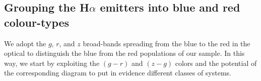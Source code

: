 \documentclass[fleqn,usenatbib]{mnras}
\newcommand{\comment}[1]{\textcolor{red}{#1}}
\begin{document}
\subsection{Grouping the H{$\alpha$} emitters into blue and red colour-types}
\label{sec:apply-hac-hdbscan}

We adopt the $g$, $r$, and $z$ broad-bands spreading from the blue to the red in the optical 
to distinguish the blue from the red populations of our sample. In this way, we start by 
exploiting the $(g - r)$ and $(z - g)$ colors and the potential of the corresponding diagram 
to put in evidence different classes of systems. %


\end{document}
